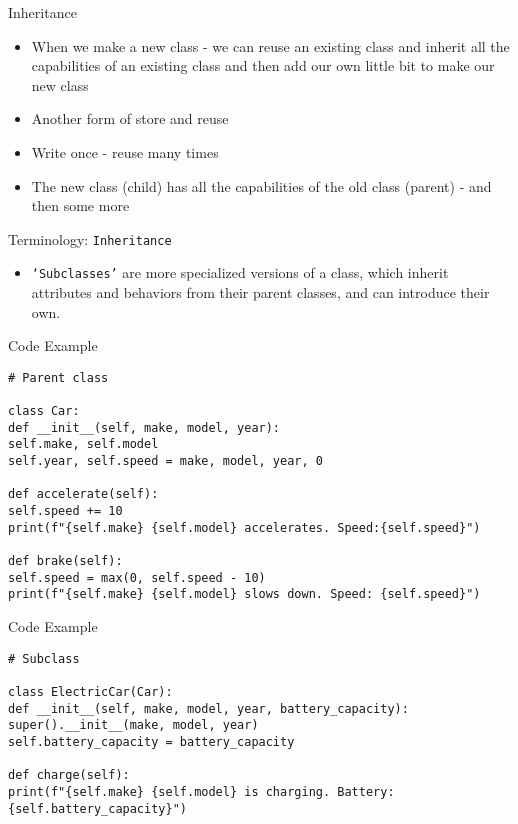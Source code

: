 \documentclass[serif, aspectratio=169]{beamer}
\begin{document}
\begin{frame}{Inheritance}
	\begin{itemize}
	    \item When we make a new class - we can reuse an existing class and inherit all the capabilities of an existing class and then add our own little bit to make our new class
	    \item Another form of store and reuse
	    \item Write once - reuse many times
	    \item The new class (child) has all the capabilities of the old class (parent) - and then some more
	    
	\end{itemize}
\end{frame}

\begin{frame}[fragile]{Terminology: \texttt{\color{red}Inheritance}}
	\begin{itemize}
		\item \texttt{\color{red}‘Subclasses’} are more specialized versions of a class, which inherit attributes and behaviors from their parent classes, and can introduce their own.  		
	\end{itemize}
\end{frame}

\begin{frame}[fragile]{Code Example}
    \begin{lstlisting}
# Parent class

class Car:
def __init__(self, make, model, year):
self.make, self.model
self.year, self.speed = make, model, year, 0

def accelerate(self):
self.speed += 10
print(f"{self.make} {self.model} accelerates. Speed:{self.speed}")

def brake(self):
self.speed = max(0, self.speed - 10)
print(f"{self.make} {self.model} slows down. Speed: {self.speed}")
    \end{lstlisting}
\end{frame}

\begin{frame}[fragile]{Code Example}
    \begin{lstlisting}
# Subclass

class ElectricCar(Car):
def __init__(self, make, model, year, battery_capacity):
super().__init__(make, model, year)
self.battery_capacity = battery_capacity

def charge(self):
print(f"{self.make} {self.model} is charging. Battery: {self.battery_capacity}")
    \end{lstlisting}
\end{frame}
\end{document}
